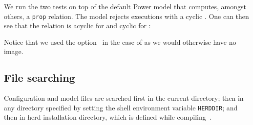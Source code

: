 We run the two tests on top of the default Power model that computes,
amongst others, a \texttt{prop} relation. The model rejects executions
with a cyclic .
One can then see that the relation  is acyclic
for  and cyclic for :
\begin{center}\quad\quad{}\end{center}
Notice that we used the option~ in the case
of  as we would otherwise have no image.


\subsection{\label{herd:searchpath}File searching}
Configuration and model files are searched first in the current directory;
then in any directory specified
by setting the shell environment variable \texttt{HERDDIR};
and then in herd installation directory, which is defined
while compiling~\herd.

